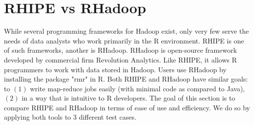 \section{RHIPE vs RHadoop}
While several programming frameworks for Hadoop exist, only very few serve the needs of data analysts who work primarily in the R environment.  RHIPE is one of such frameworks, another is  RHadoop.
RHadoop is open-source framework developed by commercial firm Revolution Analytics.  Like RHIPE, it allows R programmers to work with data stored in Hadoop.  Users use RHadoop by installing the package "rmr" in R.
Both RHIPE and RHadoop have similar goals:  to $(1)$ write map-reduce jobs easily (with minimal code as compared to Java), $(2)$ in a way that is intuitive to R developers.
The goal of this section is to compare RHIPE and RHadoop in terms of ease of use and efficiency.  We do so by applying both tools to 3 different test cases.
